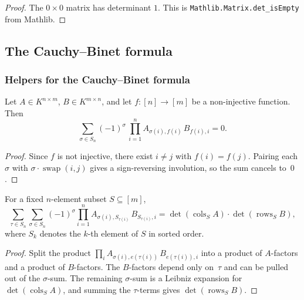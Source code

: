 \begin{proof}
\leanok
The $0 \times 0$ matrix has determinant $1$.
This is \texttt{Mathlib.Matrix.det\_isEmpty} from Mathlib.
\end{proof}

\subsection{The Cauchy--Binet formula}

\subsubsection{Helpers for the Cauchy--Binet formula}

\begin{lemma}
\label{lem.det.CB.nonsquare}
\leanhelper
\leanok
Let $A\in K^{n\times m}$, $B\in K^{m\times n}$, and let
$f\colon [n]\to [m]$ be a non-injective function.  Then
\[
\sum_{\sigma\in S_n} (-1)^{\sigma}\,
\prod_{i=1}^n A_{\sigma(i),f(i)}\, B_{f(i),i}
= 0.
\]
\end{lemma}

\begin{proof}
Since $f$ is not injective, there exist $i\ne j$ with $f(i)=f(j)$.
Pairing each $\sigma$ with $\sigma\cdot\operatorname{swap}(i,j)$
gives a sign-reversing involution, so the sum cancels to~$0$.
\end{proof}

\begin{lemma}
\label{lem.det.CB.subset_factor}
\leanhelper
\leanok
For a fixed $n$-element subset $S\subseteq [m]$,
\[
\sum_{\tau\in S_n}\sum_{\sigma\in S_n}
(-1)^{\sigma}\prod_{i=1}^n
A_{\sigma(i),S_{\tau(i)}}\,B_{S_{\tau(i)},i}
= \det(\operatorname{cols}_S A)\cdot\det(\operatorname{rows}_S B),
\]
where $S_k$ denotes the $k$-th element of $S$ in sorted order.
\end{lemma}

\begin{proof}
Split the product $\prod_i A_{\sigma(i),e(\tau(i))}\,B_{e(\tau(i)),i}$
into a product of $A$-factors and a product of $B$-factors.
The $B$-factors depend only on~$\tau$ and can be pulled out of the
$\sigma$-sum. The remaining $\sigma$-sum is a Leibniz expansion
for $\det(\operatorname{cols}_S A)$, and summing the $\tau$-terms
gives $\det(\operatorname{rows}_S B)$.
\end{proof}

